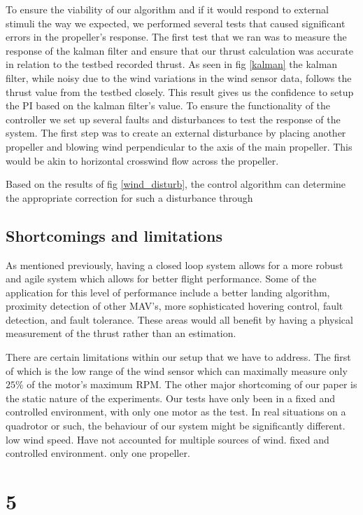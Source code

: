 \documentclass[conference]{IEEEtran}
\begin{document}
To ensure the viability of our algorithm and if it would respond to external stimuli the way we expected, we performed several tests that caused significant errors in the propeller's response. The first test that we ran was to measure the response of the kalman filter and ensure that our thrust calculation was accurate in relation to the testbed recorded thrust. As seen in fig \ref{kalman} the kalman filter, while noisy due to the wind variations in the wind sensor data, follows the thrust value from the testbed closely. This result gives us the confidence to setup the PI based on the kalman filter's value. 
To ensure the functionality of the controller we set up several faults and disturbances to test the response of the system. The first step was to create an external disturbance by placing another propeller and blowing wind perpendicular to the axis of the main propeller. This would be akin to horizontal crosswind flow across the propeller.

Based on the results of fig \ref{wind_disturb}, the control algorithm can determine the appropriate correction for such a disturbance through

\subsection{Shortcomings and limitations}
As mentioned previously, having a closed loop system allows for a more robust and agile system which allows for better flight performance. Some of the application for this level of performance include a better landing algorithm, proximity detection of other MAV's, more sophisticated hovering control, fault detection, and fault tolerance. These areas would all benefit by having a physical measurement of the thrust rather than an estimation.

There are certain limitations within our setup that we have to address. The first of which is the low range of the wind sensor which can maximally measure only $25\%$ of the motor's maximum RPM. The other major shortcoming of our paper is the static nature of the experiments. Our tests have only been in a fixed and controlled environment, with only one motor as the test. In real situations on a quadrotor or such, the behaviour of our system might be significantly different.  	
low wind speed. Have not accounted for multiple sources of wind. fixed and controlled environment. only one propeller. 
\section{5}
\end{document}
